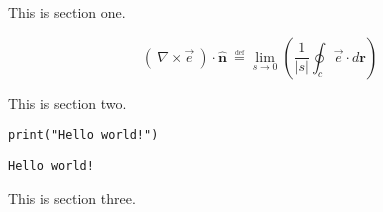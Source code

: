 This is section one.

\begin{equation}
(~\nabla \times \vec{e}~) \cdot \mathbf{\hat{n}} \
        \overset{\underset{\mathrm{def}}{}}{=}
    \lim_{s \to 0}\left( \frac{1}{|s|}\oint_{c} \vec{e} \cdot d\mathbf{r}\right)
\end{equation}

This is section two.

\begin{verbatim}
print("Hello world!")
\end{verbatim}

\begin{verbatim}
Hello world!
\end{verbatim}

This is section three.
